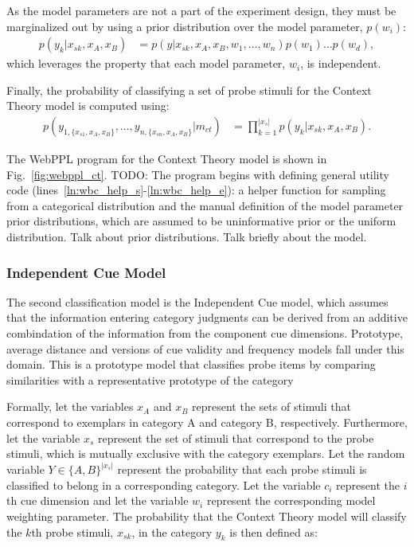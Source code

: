 \documentclass{article}
\begin{document}
As the model parameters are not a part of the experiment design, they must be marginalized out by using a prior distribution over the model parameter, $p(w_i)$:
\begin{align}
    p(y_k | x_{sk}, x_A, x_B) &=  p(y|x_{sk}, x_A, x_B ,w_1, \dots, w_n) p(w_1) \dots p(w_d),
\end{align}
which leverages the property that each model parameter, $w_i$, is independent.

Finally, the probability of classifying a set of probe stimuli for the Context Theory model is computed using:
\begin{align}
    p(y_{1,\{x_{s1}, x_A, x_B\}}, \dots, y_{n,\{x_{sn}, x_A, x_B\}} | m_{ct}) &=  \prod\limits_{k=1}^{|x_s|} p(y_k|x_{sk}, x_A, x_B).
\end{align}

The WebPPL program for the Context Theory model is shown in Fig.~\ref{fig:webppl_ct}. TODO: The program begins with defining general utility code (lines~\ref{ln:wbc_help_s}-\ref{ln:wbc_help_e}): a helper function for sampling from a categorical distribution and the manual definition of the model parameter prior distributions, which are assumed to be uninformative prior or the uniform distribution. Talk about prior distributions. Talk briefly about the model.


\subsubsection{Independent Cue Model}
The second classification model is the Independent Cue model, which assumes that the information entering category judgments can be derived from an additive combindation of the information from the component cue dimensions. Prototype, average distance and versions of cue validity and frequency models fall under this domain. This is a prototype model that classifies probe items by comparing similarities with a representative prototype of the category




Formally, let the variables $x_A$ and $x_B$ represent the sets of stimuli that correspond to exemplars in category A and category B, respectively. Furthermore, let the variable $x_s$ represent the set of stimuli that correspond to the probe stimuli, which is mutually exclusive with the category exemplars. Let the random variable $Y \in \{A,B\}^{|x_s|}$ represent the probability that each probe stimuli is classified to belong in a corresponding category. Let the variable $c_i$ represent the $i$th cue dimension and let the variable $w_i$ represent the corresponding model weighting parameter. The probability that the Context Theory model will classify the $k$th probe stimuli, $x_{sk}$, in the category $y_k$ is then defined as:
\end{document}
